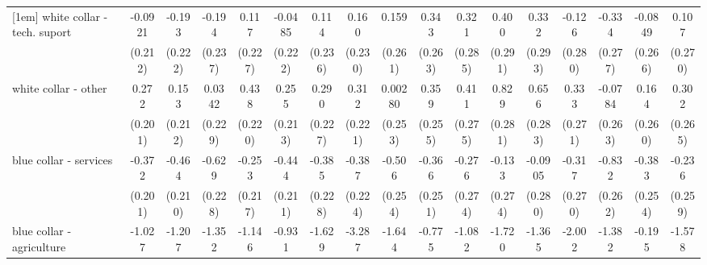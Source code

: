 {\begin{tabular}{l*{16}{c}}
[1em]
white collar - tech. suport&     -0.0921         &      -0.193         &      -0.194         &       0.117         &     -0.0485         &       0.114         &       0.160         &       0.159         &       0.343         &       0.321         &       0.400         &       0.332         &      -0.126         &      -0.334         &     -0.0849         &       0.107         \\
                    &     (0.212)         &     (0.222)         &     (0.237)         &     (0.227)         &     (0.222)         &     (0.236)         &     (0.230)         &     (0.261)         &     (0.263)         &     (0.285)         &     (0.291)         &     (0.293)         &     (0.280)         &     (0.277)         &     (0.266)         &     (0.270)         \\
[1em]
white collar - other&       0.272         &       0.153         &      0.0342         &       0.438\sym{*}  &       0.255         &       0.290         &       0.312         &     0.00280         &       0.359         &       0.411         &       0.829\sym{**} &       0.656\sym{*}  &       0.333         &     -0.0784         &       0.164         &       0.302         \\
                    &     (0.201)         &     (0.212)         &     (0.229)         &     (0.220)         &     (0.213)         &     (0.227)         &     (0.221)         &     (0.253)         &     (0.255)         &     (0.275)         &     (0.281)         &     (0.283)         &     (0.271)         &     (0.263)         &     (0.260)         &     (0.265)         \\
[1em]
blue collar - services&      -0.372         &      -0.464\sym{*}  &      -0.629\sym{**} &      -0.253         &      -0.444\sym{*}  &      -0.385         &      -0.387         &      -0.506\sym{*}  &      -0.366         &      -0.276         &      -0.133         &     -0.0905         &      -0.317         &      -0.832\sym{**} &      -0.383         &      -0.236         \\
                    &     (0.201)         &     (0.210)         &     (0.228)         &     (0.217)         &     (0.211)         &     (0.228)         &     (0.224)         &     (0.254)         &     (0.251)         &     (0.274)         &     (0.274)         &     (0.280)         &     (0.270)         &     (0.262)         &     (0.254)         &     (0.259)         \\
[1em]
blue collar - agriculture&      -1.027         &      -1.207         &      -1.352\sym{*}  &      -1.146         &      -0.931         &      -1.629\sym{*}  &      -3.287\sym{***}&      -1.644\sym{**} &      -0.775         &      -1.082         &      -1.720\sym{*}  &      -1.365         &      -2.002\sym{*}  &      -1.382\sym{*}  &      -0.195         &      -1.578\sym{**} \\

\end{tabular}}
